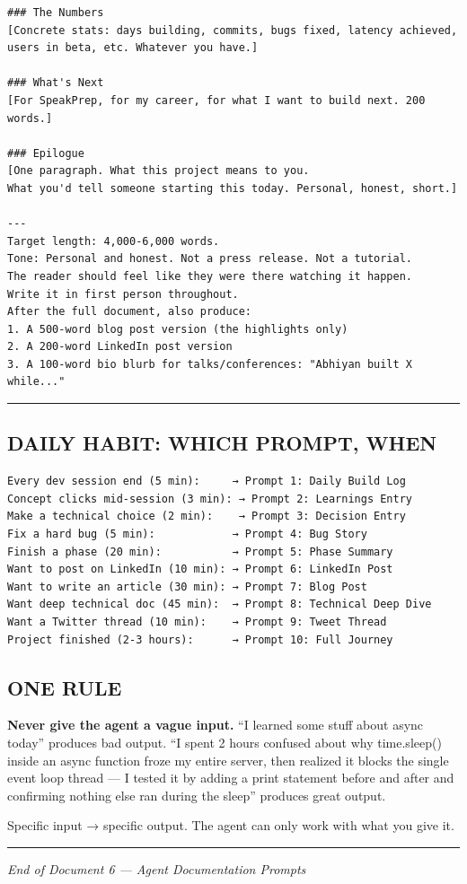 \documentclass[
  11pt,
]{article}
\begin{document}
\begin{lstlisting}
### The Numbers
[Concrete stats: days building, commits, bugs fixed, latency achieved,
users in beta, etc. Whatever you have.]

### What's Next
[For SpeakPrep, for my career, for what I want to build next. 200 words.]

### Epilogue
[One paragraph. What this project means to you.
What you'd tell someone starting this today. Personal, honest, short.]

---
Target length: 4,000-6,000 words.
Tone: Personal and honest. Not a press release. Not a tutorial.
The reader should feel like they were there watching it happen.
Write it in first person throughout.
After the full document, also produce:
1. A 500-word blog post version (the highlights only)
2. A 200-word LinkedIn post version
3. A 100-word bio blurb for talks/conferences: "Abhiyan built X while..."
\end{lstlisting}

\begin{center}\rule{0.5\linewidth}{0.5pt}\end{center}

\hypertarget{daily-habit-which-prompt-when}{%
\subsection{DAILY HABIT: WHICH PROMPT,
WHEN}\label{daily-habit-which-prompt-when}}

\begin{lstlisting}
Every dev session end (5 min):     → Prompt 1: Daily Build Log
Concept clicks mid-session (3 min): → Prompt 2: Learnings Entry
Make a technical choice (2 min):    → Prompt 3: Decision Entry
Fix a hard bug (5 min):            → Prompt 4: Bug Story
Finish a phase (20 min):           → Prompt 5: Phase Summary
Want to post on LinkedIn (10 min): → Prompt 6: LinkedIn Post
Want to write an article (30 min): → Prompt 7: Blog Post
Want deep technical doc (45 min):  → Prompt 8: Technical Deep Dive
Want a Twitter thread (10 min):    → Prompt 9: Tweet Thread
Project finished (2-3 hours):      → Prompt 10: Full Journey
\end{lstlisting}

\hypertarget{one-rule}{%
\subsection{ONE RULE}\label{one-rule}}

\textbf{Never give the agent a vague input.} ``I learned some stuff
about async today'' produces bad output. ``I spent 2 hours confused
about why time.sleep() inside an async function froze my entire server,
then realized it blocks the single event loop thread --- I tested it by
adding a print statement before and after and confirming nothing else
ran during the sleep'' produces great output.

Specific input → specific output. The agent can only work with what you
give it.

\begin{center}\rule{0.5\linewidth}{0.5pt}\end{center}

\emph{End of Document 6 --- Agent Documentation Prompts}
\end{document}
